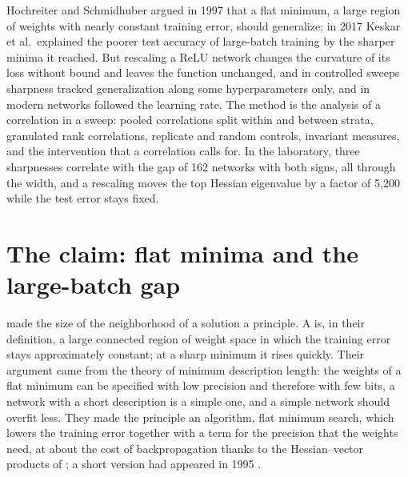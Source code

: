 \begin{refsection}

\begin{chaptersummary}
Hochreiter and Schmidhuber argued in 1997 that a flat minimum, a large region of weights with nearly constant training error, should generalize; in 2017 Keskar et al.\ explained the poorer test accuracy of large-batch training by the sharper minima it reached. But rescaling a ReLU network changes the curvature of its loss without bound and leaves the function unchanged, and in controlled sweeps sharpness tracked generalization along some hyperparameters only, and in modern networks followed the learning rate. The method is the analysis of a correlation in a sweep: pooled correlations split within and between strata, granulated rank correlations, replicate and random controls, invariant measures, and the intervention that a correlation calls for. In the laboratory, three sharpnesses correlate with the gap of 162 networks with both signs, all through the width, and a rescaling moves the top Hessian eigenvalue by a factor of 5,200 while the test error stays fixed.
\end{chaptersummary}

\section{The claim: flat minima and the large-batch gap}\label{sec:sharpness:claim}

\Textcite{HochreiterSchmidhuber1997} made the size of the neighborhood of a solution a principle. A  is, in their definition, a large connected region of weight space in which the training error stays approximately constant; at a sharp minimum it rises quickly. Their argument came from the theory of minimum description length: the weights of a flat minimum can be specified with low precision and therefore with few bits, a network with a short description is a simple one, and a simple network should overfit less. They made the principle an algorithm, flat minimum search, which lowers the training error together with a term for the precision that the weights need, at about the cost of backpropagation thanks to the Hessian--vector products of \textcite{Pearlmutter1994}; a short version had appeared in 1995 \parencite{HochreiterSchmidhuber1995}.


\end{refsection}
